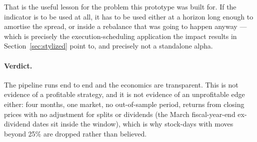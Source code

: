 That is the useful lesson for the problem this prototype was built for. If the
indicator is to be used at all, it has to be used either at a horizon long enough
to amortise the spread, or inside a rebalance that was going to happen anyway ---
which is precisely the execution-scheduling application the impact results in
Section~\ref{sec:stylized} point to, and precisely not a standalone alpha.

\paragraph{Verdict.}
The pipeline runs end to end and the economics are transparent. This is not
evidence of a profitable strategy, and it is not evidence of an unprofitable
edge either: four months, one market, no out-of-sample period, returns from
closing prices with no adjustment for splits or dividends (the March
fiscal-year-end ex-dividend dates sit inside the window), which is why
stock-days with moves beyond 25\% are dropped rather than believed.
